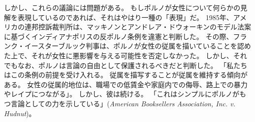 \documentclass[paper=a4,book,openany]{jlreq}
\newcommand{\ig}[1]{}           %
\begin{document}
しかし、これらの議論には問題がある。
もしポルノが女性について何らかの見解を表現しているのであれば、それはやはり一種の「表現」だ。
1985年、アメリカの連邦控訴裁判所は、マッキノンとアンドレア・ドウォーキン\ig{Andrea Dworkin}のモデル法案に基づくインディアナポリスの反ポルノ条例を違憲と判断した。
その際、フランク・イースターブルック判事は、ポルノが女性の従属を描いていることを認めた上で、それが女性に悪影響を与える可能性を否定しなかった。
しかし、それでもなお、ポルノは言論の自由として保護されるべきだと判断した。
「私たちはこの条例の前提を受け入れる。
従属を描写することが従属を維持する傾向がある。
女性の従属的地位は、職場での低賃金や家庭内での侮辱、路上での暴力やレイプにつながる」。
しかし、彼は続ける。
「これはシンプルにポルノがもつ言論としての力を示している」(\emph{American Booksellers Association, Inc. v. Hudnut})。
\end{document}
